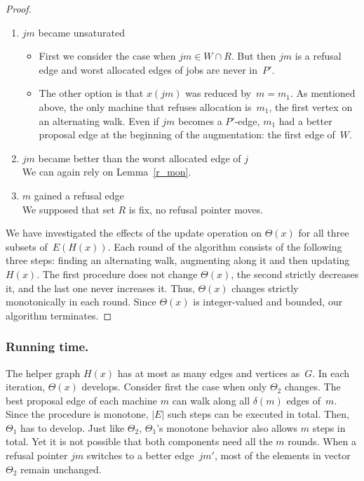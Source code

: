 \documentclass{llncs}
\begin{document}
\begin{proof}
\begin{enumerate}
	\item $jm$ became unsaturated
		\begin{itemize}
 			\item First we consider the case when $jm \in W \cap R$. But then $jm$ is a refusal edge and worst allocated edges of jobs are never in~$P'$.
			\item The other option is that $x(jm)$ was reduced by~$m = m_1$. As mentioned above, the only machine that refuses allocation is~$m_1$, the first vertex on an alternating walk. Even if $jm$ becomes a $P'$-edge, $m_1$ had a better proposal edge at the beginning of the augmentation: the first edge of~$W$.
		\end{itemize}
	\item $jm$ became better than the worst allocated edge of $j$\\ We can again rely on Lemma~\ref{r_mon}.
 	\item $m$ gained a refusal edge \\ We supposed that set $R$ is fix, no refusal pointer moves.
\end{enumerate}

We have investigated the effects of the update operation on $\Theta(x)$ for all three subsets of~$E(H(x))$. Each round of the algorithm consists of the following three steps: finding an alternating walk, augmenting along it and then updating~$H(x)$. The first procedure does not change $\Theta(x)$, the second strictly decreases it, and the last one never increases it. Thus, $\Theta(x)$ changes strictly monotonically in each round. Since $\Theta(x)$ is integer-valued and bounded, our algorithm terminates.
\end{proof}

\subsubsection*{Running time.}

The helper graph $H(x)$ has at most as many edges and vertices as~$G$. In each iteration, $\Theta(x)$ develops. Consider first the case when only $\Theta_2$ changes. The best proposal edge of each machine $m$ can walk along all $\delta(m)$ edges of~$m$. Since the procedure is monotone, $|E|$ such steps can be executed in total. Then, $\Theta_1$ has to develop. Just like $\Theta_2$, $\Theta_1$'s monotone behavior also allows $m$ steps in total. Yet it is not possible that both components need all the $m$ rounds. When a refusal pointer $jm$ switches to a better edge~$jm'$, most of the elements in vector $\Theta_2$ remain unchanged.
\end{document}
